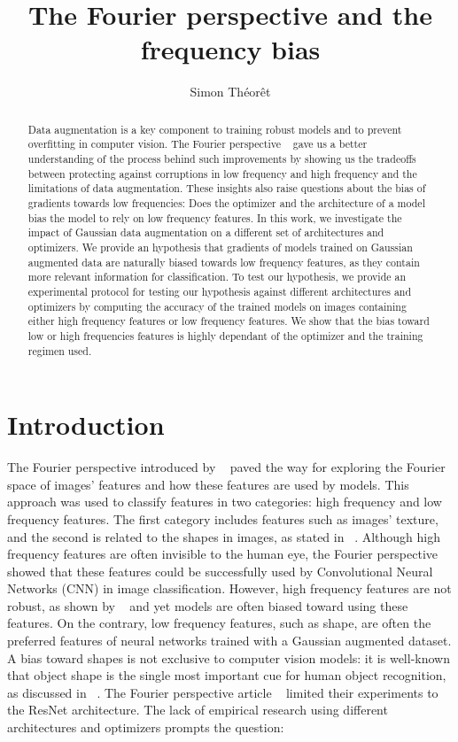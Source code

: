 \documentclass{article} \author{Simon Théorêt}
\title{The Fourier perspective and the frequency bias}
\begin{document}
\maketitle

\begin{abstract}
  Data augmentation is a key component to training robust models and
  to prevent overfitting in computer vision. The Fourier perspective
  ~\citep{yin2020fourier} gave us a better understanding of the
  process behind such improvements by showing us the tradeoffs between
  protecting against corruptions in low frequency and high frequency
  and the limitations of data augmentation. These insights also raise
  questions about the bias of gradients towards low frequencies: Does
  the optimizer and the architecture of a model bias the model to rely
  on low frequency features. In this work, we investigate the impact
  of Gaussian data augmentation on a different set of architectures
  and optimizers. We provide an hypothesis that gradients of models
  trained on Gaussian augmented data are naturally biased towards low
  frequency features, as they contain more relevant information for
  classification. To test our hypothesis, we provide an experimental
  protocol for testing our hypothesis against different architectures
  and optimizers by computing the accuracy of the trained models on
  images containing either high frequency features or low frequency
  features. We show that the bias toward low or high frequencies
  features is highly dependant of the optimizer and the training
  regimen used.
\end{abstract}

\section{Introduction}
The Fourier perspective introduced by ~\citep{yin2020fourier} paved
the way for exploring the Fourier space of images’ features and how
these features are used by models. This approach was used to classify
features in two categories: high frequency and low frequency
features. The first category includes features such as images’
texture, and the second is related to the shapes in images, as stated
in ~\citep{krishnamachari2023fourier}. Although high frequency
features are often invisible to the human eye, the Fourier perspective
showed that these features could be successfully used by Convolutional
Neural Networks (CNN) in image classification. However, high frequency
features are not robust, as shown by ~\citep{zhang2019interpreting}
and yet models are often biased toward using these features. On the
contrary, low frequency features, such as shape, are often the
preferred features of neural networks trained with a Gaussian
augmented dataset. A bias toward shapes is not exclusive to computer
vision models: it is well-known that object shape is the single most
important cue for human object recognition, as discussed in
~\citep{landau}. The Fourier perspective article
~\citep{yin2020fourier} limited their experiments to the ResNet
architecture. The lack of empirical research using different
architectures and optimizers prompts the question:
\end{document}
